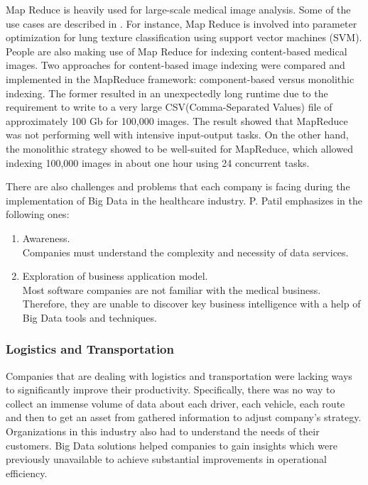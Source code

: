 \documentclass[runningheads]{llncs}
\begin{document}
Map Reduce is heavily used for large-scale medical image analysis. Some of the use cases are described in \cite{HEALTHARTICLE}. For instance, Map Reduce is involved into parameter optimization for lung texture classification using support vector machines (SVM). People are also making use of Map Reduce for indexing content-based medical images. Two approaches for content-based image indexing were compared
and implemented in the MapReduce framework: component-based versus monolithic indexing. The former resulted in an unexpectedly long runtime due to the requirement to write to a very large CSV(Comma-Separated Values) file of approximately 100 Gb for 100,000 images. The result showed that MapReduce was not performing well with intensive input-output tasks. On the other hand, the monolithic strategy showed to be well-suited for MapReduce, which allowed indexing 100,000 images in about one hour using 24 concurrent tasks. 

There are also challenges and problems that each company is facing during the implementation of Big Data in the healthcare industry. P. Patil emphasizes in \cite{HEALTHARTICLE} the following ones:

\begin{enumerate}
\item Awareness.\\ 

Companies must understand the complexity and necessity of data services.\\
\item Exploration of business application model.\\

Most software companies are not familiar with the medical business. Therefore, they are unable to discover key business intelligence with a help of Big Data tools and techniques.
\end{enumerate}

\subsubsection{Logistics and Transportation}

Companies that are dealing with logistics and transportation were lacking ways to significantly improve their productivity. Specifically, there was no way to collect an immense volume of data about each driver, each vehicle, each route and then to get an asset from gathered information to adjust company's strategy. Organizations in this industry also had to understand the needs of their customers. Big Data solutions helped companies to gain insights which were previously unavailable to achieve substantial improvements in operational efficiency.
\end{document}
